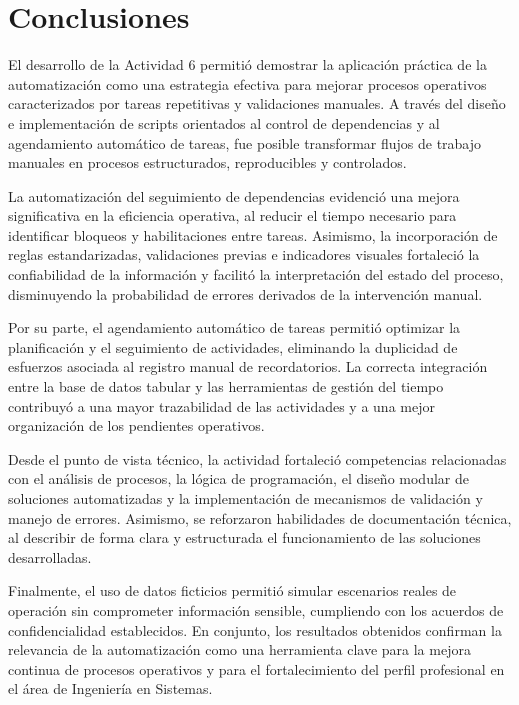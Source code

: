 \documentclass[12pt]{article}
\begin{document}
\section*{Conclusiones}

El desarrollo de la Actividad 6 permitió demostrar la aplicación práctica de la automatización como una estrategia efectiva para mejorar procesos operativos caracterizados por tareas repetitivas y validaciones manuales. A través del diseño e implementación de scripts orientados al control de dependencias y al agendamiento automático de tareas, fue posible transformar flujos de trabajo manuales en procesos estructurados, reproducibles y controlados.

La automatización del seguimiento de dependencias evidenció una mejora significativa en la eficiencia operativa, al reducir el tiempo necesario para identificar bloqueos y habilitaciones entre tareas. Asimismo, la incorporación de reglas estandarizadas, validaciones previas e indicadores visuales fortaleció la confiabilidad de la información y facilitó la interpretación del estado del proceso, disminuyendo la probabilidad de errores derivados de la intervención manual.

Por su parte, el agendamiento automático de tareas permitió optimizar la planificación y el seguimiento de actividades, eliminando la duplicidad de esfuerzos asociada al registro manual de recordatorios. La correcta integración entre la base de datos tabular y las herramientas de gestión del tiempo contribuyó a una mayor trazabilidad de las actividades y a una mejor organización de los pendientes operativos.

Desde el punto de vista técnico, la actividad fortaleció competencias relacionadas con el análisis de procesos, la lógica de programación, el diseño modular de soluciones automatizadas y la implementación de mecanismos de validación y manejo de errores. Asimismo, se reforzaron habilidades de documentación técnica, al describir de forma clara y estructurada el funcionamiento de las soluciones desarrolladas.

Finalmente, el uso de datos ficticios permitió simular escenarios reales de operación sin comprometer información sensible, cumpliendo con los acuerdos de confidencialidad establecidos. En conjunto, los resultados obtenidos confirman la relevancia de la automatización como una herramienta clave para la mejora continua de procesos operativos y para el fortalecimiento del perfil profesional en el área de Ingeniería en Sistemas.
\end{document}
